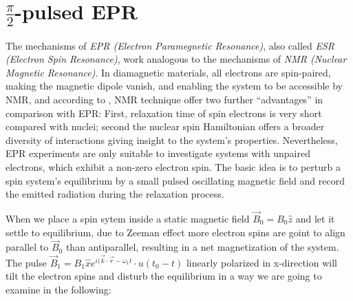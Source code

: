 \documentclass[11.5pt,a4paper]{article}
\begin{document}

\section{$\tfrac{\pi}{2}$-pulsed EPR}
The mechanisms of \emph{EPR (Electron Paramegnetic Resonance)}, also called \emph{ESR (Electron Spin Resonance)}, work analogous to the mechanisms of \emph{NMR (Nuclear Magnetic Resonance)}. In diamagnetic materials, all electrons are spin-paired, making the magnetic dipole vanish, and enabling the system to be accessible by NMR, and according to \cite[Chap. 4, p. 107]{nmr-ox}, NMR technique offer two further ``advantages'' in comparison with EPR: First, relaxation time of spin electrons is very short compared with nuclei; second the nuclear spin Hamiltonian offers a broader diversity of interactions giving insight to the system's properties. Nevertheless, EPR experiments are only suitable to investigate systems with unpaired electrons, which exhibit a non-zero electron spin. The basic idea is to perturb a spin system's equilibrium by a small pulsed oscillating magnetic field and record the emitted radiation during the relaxation process. 

When we place a spin sytem inside a static magnetic field $\vec{B}_0 = B_0 \hat{z}$ and let it settle to equilibrium, due to Zeeman effect more electron spins are goint to align parallel to $\vec{B}_0$ than antiparallel, resulting in a net magnetization of the system. The pulse $\vec{B}_1 = B_1 \hat{x} e^{i(\vec{k}\cdot\vec{r}-\omega_1 t} \cdot u(t_0-t)$ linearly polarized in x-direction will tilt the electron spins and disturb the equilibrium in a way we are going to examine in the following:
\end{document}
